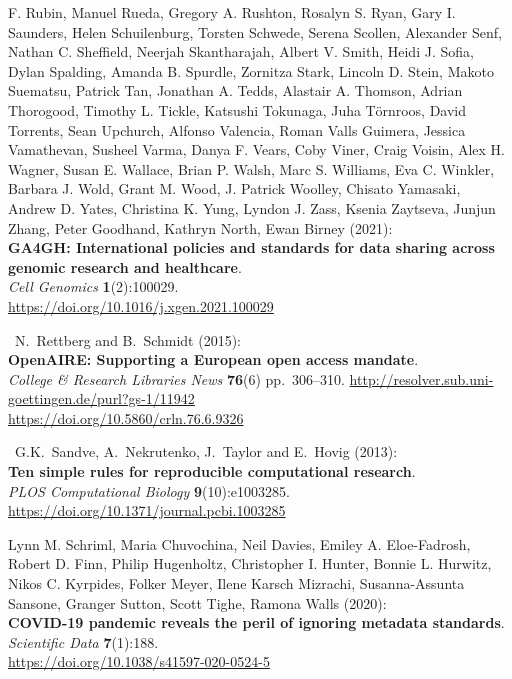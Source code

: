 \begin{thebibliography}{9}
F. Rubin, Manuel Rueda, Gregory A. Rushton, Rosalyn S. Ryan, Gary I.
Saunders, Helen Schuilenburg, Torsten Schwede, Serena Scollen, Alexander
Senf, Nathan C. Sheffield, Neerjah Skantharajah, Albert V. Smith, Heidi
J. Sofia, Dylan Spalding, Amanda B. Spurdle, Zornitza Stark, Lincoln D.
Stein, Makoto Suematsu, Patrick Tan, Jonathan A. Tedds, Alastair A.
Thomson, Adrian Thorogood, Timothy L. Tickle, Katsushi Tokunaga, Juha
Törnroos, David Torrents, Sean Upchurch, Alfonso Valencia, Roman Valls
Guimera, Jessica Vamathevan, Susheel Varma, Danya F. Vears, Coby Viner,
Craig Voisin, Alex H. Wagner, Susan E. Wallace, Brian P. Walsh, Marc S.
Williams, Eva C. Winkler, Barbara J. Wold, Grant M. Wood, J. Patrick
Woolley, Chisato Yamasaki, Andrew D. Yates, Christina K. Yung, Lyndon J.
Zass, Ksenia Zaytseva, Junjun Zhang, Peter Goodhand, Kathryn North, Ewan
Birney (2021):\\
\textbf{GA4GH: International policies and standards for data sharing
across genomic research and healthcare}.\\
\emph{Cell Genomics} \textbf{1}(2):100029.\\
\url{https://doi.org/10.1016/j.xgen.2021.100029}

~N.~Rettberg and B.~Schmidt (2015):\\
\textbf{OpenAIRE: Supporting a European open access mandate}.\\
\emph{College \& Research Libraries News} \textbf{76}(6) pp.~306--310.
\url{http://resolver.sub.uni-goettingen.de/purl?gs-1/11942}\\
\url{https://doi.org/10.5860/crln.76.6.9326}

~G.K.~Sandve, A.~Nekrutenko, J.~Taylor and E.~Hovig (2013):\\
\textbf{Ten simple rules for reproducible computational research}.\\
\emph{PLOS Computational Biology} \textbf{9}(10):e1003285.\\
\url{https://doi.org/10.1371/journal.pcbi.1003285}

 Lynn M. Schriml, Maria Chuvochina, Neil Davies, Emiley A.
Eloe-Fadrosh, Robert D. Finn, Philip Hugenholtz, Christopher I. Hunter,
Bonnie L. Hurwitz, Nikos C. Kyrpides, Folker Meyer, Ilene Karsch
Mizrachi, Susanna-Assunta Sansone, Granger Sutton, Scott Tighe, Ramona
Walls (2020):\\
\textbf{COVID-19 pandemic reveals the peril of ignoring metadata
standards}.\\
\emph{Scientific Data} \textbf{7}(1):188.\\
\url{https://doi.org/10.1038/s41597-020-0524-5}


\end{thebibliography}
